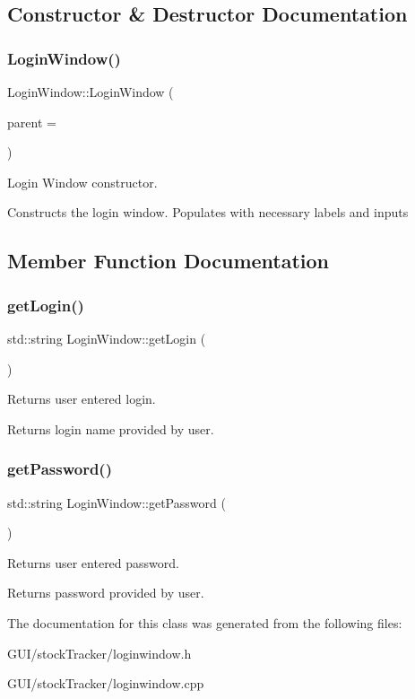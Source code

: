 \subsection{Constructor \& Destructor Documentation}
\mbox{\label{class_login_window_aacfb01de174b9eaf5a712bbfd4b6d9b5}} 
\subsubsection{\texorpdfstring{Login\+Window()}{LoginWindow()}}
{\footnotesize\ttfamily Login\+Window\+::\+Login\+Window (\begin{DoxyParamCaption}\item[{Q\+Widget $\ast$}]{parent = {} }\end{DoxyParamCaption})}



Login Window constructor. 

Constructs the login window. Populates with necessary labels and inputs 

\subsection{Member Function Documentation}
\mbox{\label{class_login_window_abb7c1af4eff6d4bcfcae122ee77089f1}} 
\subsubsection{\texorpdfstring{get\+Login()}{getLogin()}}
{\footnotesize\ttfamily std\+::string Login\+Window\+::get\+Login (\begin{DoxyParamCaption}{ }\end{DoxyParamCaption})}



Returns user entered login. 

Returns login name provided by user. \mbox{\label{class_login_window_a708710b83651cfa427d8f213b6a1890e}} 
\subsubsection{\texorpdfstring{get\+Password()}{getPassword()}}
{\footnotesize\ttfamily std\+::string Login\+Window\+::get\+Password (\begin{DoxyParamCaption}{ }\end{DoxyParamCaption})}



Returns user entered password. 

Returns password provided by user. 

The documentation for this class was generated from the following files\+:\begin{DoxyCompactItemize}
\item 
G\+U\+I/stock\+Tracker/loginwindow.\+h\item 
G\+U\+I/stock\+Tracker/loginwindow.\+cpp\end{DoxyCompactItemize}
